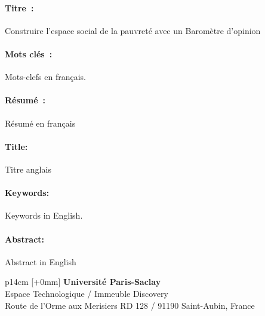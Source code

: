 \documentclass[12pt,a4paper]{reedthesis}
\begin{document}
\lhead{}
\rhead{}
\rfoot{}
\cfoot{}
\lfoot{}

\noindent
\begin{mdframed}[linecolor=Prune,linewidth=1]
\vspace{-.25cm}
\paragraph*{Titre~:} Construire l'espace social de la pauvreté avec un Baromètre d'opinion
\begin{small}
\vspace{-.25cm}
\paragraph*{Mots clés~:} Mots-clefs en français.

\vspace{-.5cm}
\begin{multicols}{2}
\paragraph*{Résumé~:} Résumé en français
\end{multicols}
\end{small}
\end{mdframed}
\begin{mdframed}[linecolor=Prune,linewidth=1]
\vspace{-.25cm}
\paragraph*{Title:} Titre anglais
\begin{small}
\vspace{-.25cm}
\paragraph*{Keywords:} Keywords in English.

\vspace{-.5cm}
\begin{multicols}{2}
\paragraph*{Abstract:} Abstract in English
\end{multicols}
\end{small}
\end{mdframed}

\vfill
{}\selectfont
\noindent\begin{tabular}{p{14cm}}
[+0mm]{\small {\color{Prune} {\bf Université Paris-Saclay}\\
{\scriptsize Espace Technologique / Immeuble Discovery}\\
{\scriptsize  Route de l’Orme aux Merisiers RD 128 / 91190 Saint-Aubin, France}}}\\\mbox{}
\end{tabular}

\end{document}
